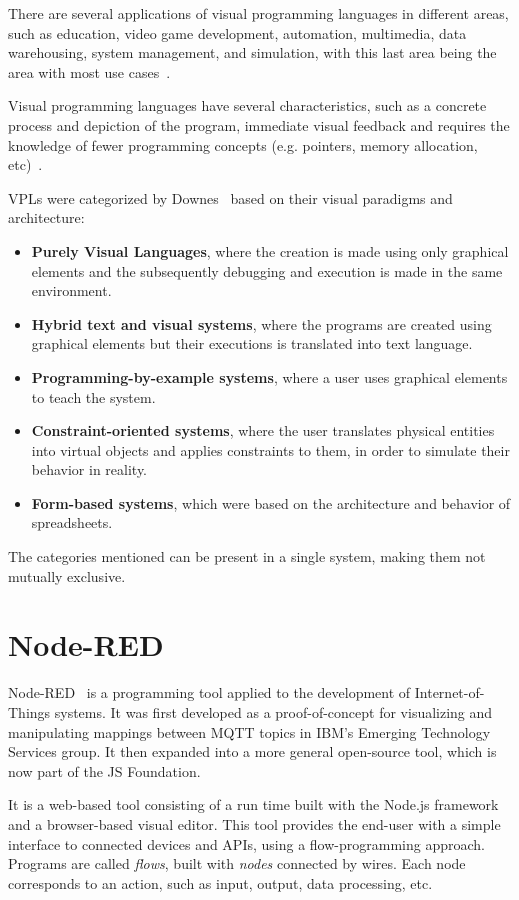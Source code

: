 There are several applications of visual programming languages in different areas, such as education, video game development, automation, multimedia, data warehousing, system management, and simulation, with this last area being the area with most use cases~\cite{survey_vpl_iot}.

Visual programming languages have several characteristics, such as a concrete process and depiction of the program, immediate visual feedback and requires the knowledge of fewer programming concepts (e.g. pointers, memory allocation, etc)~\cite{scaling_vpls}.

VPLs were categorized by Downes~\cite{vpls_survey} based on their visual paradigms and architecture: 
\begin{itemize}
    \item \textbf{Purely Visual Languages}, where the creation is made using only graphical elements and the subsequently debugging and execution is made in the same environment.
    \item \textbf{Hybrid text and visual systems}, where the programs are created using graphical elements but their executions is translated into text language.
    \item \textbf{Programming-by-example systems}, where a user uses graphical elements to teach the system.
    \item \textbf{Constraint-oriented systems}, where the user translates physical entities into virtual objects and applies constraints to them, in order to simulate their behavior in reality.
    \item \textbf{Form-based systems}, which were based on the architecture and behavior of spreadsheets.
\end{itemize}
The categories mentioned can be present in a single system, making them not mutually exclusive.

\section{Node-RED}\label{sec:node-red}

Node-RED~\cite{node_red} is a programming tool applied to the development of Internet-of-Things systems. It was first developed as a proof-of-concept for visualizing and manipulating mappings between MQTT topics in IBM's Emerging Technology Services group. It then expanded into a more general open-source tool, which is now part of the JS Foundation.

It is a web-based tool consisting of a run time built with the Node.js framework and a browser-based visual editor. This tool provides the end-user with a simple interface to connected devices and APIs, using a flow-programming approach. Programs are called \emph{flows}, built with \emph{nodes} connected by wires. Each node corresponds to an action, such as input, output, data processing, etc.

